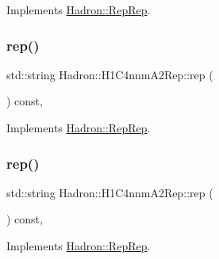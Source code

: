 Implements \mbox{\hyperlink{structHadron_1_1RepRep_ab3213025f6de249f7095892109575fde}{Hadron\+::\+Rep\+Rep}}.

\mbox{\label{structHadron_1_1H1C4nnmA2Rep_a1f403babca36b3e12ab4f6a84e0b0bfd}} 
\subsubsection{\texorpdfstring{rep()}{rep()}\hspace{0.1cm}{\footnotesize\ttfamily [2/5]}}
{\footnotesize\ttfamily std\+::string Hadron\+::\+H1\+C4nnm\+A2\+Rep\+::rep (\begin{DoxyParamCaption}{ }\end{DoxyParamCaption}) const\hspace{0.3cm}{\ttfamily [inline]}, {\ttfamily [virtual]}}



Implements \mbox{\hyperlink{structHadron_1_1RepRep_ab3213025f6de249f7095892109575fde}{Hadron\+::\+Rep\+Rep}}.

\mbox{\label{structHadron_1_1H1C4nnmA2Rep_a1f403babca36b3e12ab4f6a84e0b0bfd}} 
\subsubsection{\texorpdfstring{rep()}{rep()}\hspace{0.1cm}{\footnotesize\ttfamily [3/5]}}
{\footnotesize\ttfamily std\+::string Hadron\+::\+H1\+C4nnm\+A2\+Rep\+::rep (\begin{DoxyParamCaption}{ }\end{DoxyParamCaption}) const\hspace{0.3cm}{\ttfamily [inline]}, {\ttfamily [virtual]}}



Implements \mbox{\hyperlink{structHadron_1_1RepRep_ab3213025f6de249f7095892109575fde}{Hadron\+::\+Rep\+Rep}}.

\mbox{\label{structHadron_1_1H1C4nnmA2Rep_a1f403babca36b3e12ab4f6a84e0b0bfd}} 
